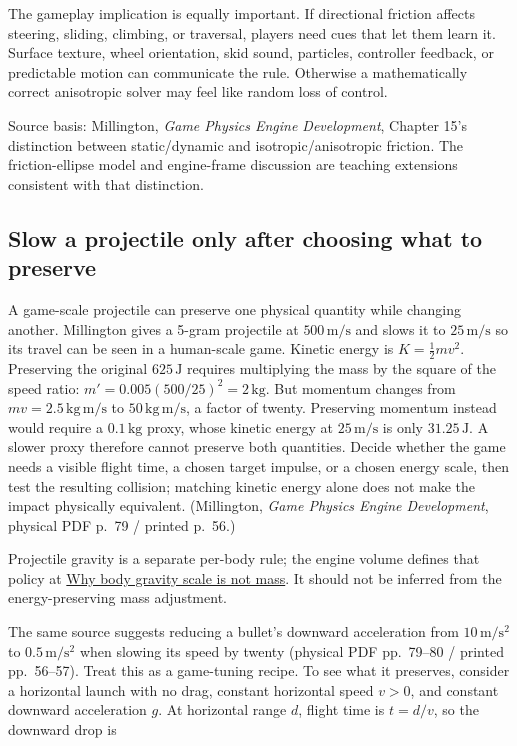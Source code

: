 The gameplay implication is equally important. If directional friction affects steering, sliding, climbing, or traversal, players need cues that let them learn it. Surface texture, wheel orientation, skid sound, particles, controller feedback, or predictable motion can communicate the rule. Otherwise a mathematically correct anisotropic solver may feel like random loss of control.

Source basis: Millington, \emph{Game Physics Engine Development}, Chapter 15's distinction between static/dynamic and isotropic/anisotropic friction. The friction-ellipse model and engine-frame discussion are teaching extensions consistent with that distinction.

\subsection{Slow a projectile only after choosing what to preserve}\label{06-engine-ii-ch047-slow-a-projectile-only-after-choosing-what-to-preserve}

A game-scale projectile can preserve one physical quantity while changing another. Millington gives a 5-gram projectile at \(500\,\mathrm{m/s}\) and slows it to \(25\,\mathrm{m/s}\) so its travel can be seen in a human-scale game. Kinetic energy is \(K=\tfrac12mv^2\). Preserving the original \(625\,\mathrm J\) requires multiplying the mass by the square of the speed ratio: \(m'=0.005(500/25)^2=2\,\mathrm{kg}\). But momentum changes from \(mv=2.5\,\mathrm{kg\,m/s}\) to \(50\,\mathrm{kg\,m/s}\), a factor of twenty. Preserving momentum instead would require a \(0.1\,\mathrm{kg}\) proxy, whose kinetic energy at \(25\,\mathrm{m/s}\) is only \(31.25\,\mathrm J\). A slower proxy therefore cannot preserve both quantities. Decide whether the game needs a visible flight time, a chosen target impulse, or a chosen energy scale, then test the resulting collision; matching kinetic energy alone does not make the impact physically equivalent. (Millington, \emph{Game Physics Engine Development}, physical PDF p.~79 / printed p.~56.)

Projectile gravity is a separate per-body rule; the engine volume defines that policy at \hyperref[06-engine-ii-ch038-why-body-gravity-scale-is-not-mass]{Why body gravity scale is not mass}. It should not be inferred from the energy-preserving mass adjustment.

The same source suggests reducing a bullet's downward acceleration from \(10\,\mathrm{m/s^2}\) to \(0.5\,\mathrm{m/s^2}\) when slowing its speed by twenty (physical PDF pp.~79--80 / printed pp.~56--57). Treat this as a game-tuning recipe. To see what it preserves, consider a horizontal launch with no drag, constant horizontal speed \(v>0\), and constant downward acceleration \(g\). At horizontal range \(d\), flight time is \(t=d/v\), so the downward drop is

